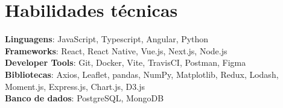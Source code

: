 \documentclass[letterpaper,11pt]{article}
\begin{document}
\section{Habilidades técnicas}
 \begin{itemize}[leftmargin=0.15in, label={}]
    \small{\item{
     \textbf{Linguagens}{: JavaScript, Typescript, Angular, Python} \\
     \textbf{Frameworks}{: React, React Native, Vue.js, Next.js, Node.js} \\
     \textbf{Developer Tools}{: Git, Docker, Vite, TravisCI, Postman, Figma} \\
     \textbf{Bibliotecas}{: Axios, Leaflet, pandas, NumPy, Matplotlib, Redux, Lodash, Moment.js, Express.js, Chart.js, D3.js} \\
     \textbf{Banco de dados}{: PostgreSQL, MongoDB}
    }}
 \end{itemize}


\end{document}
